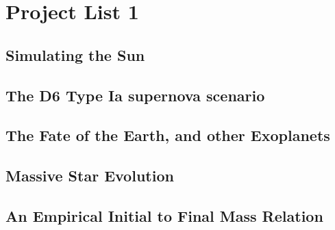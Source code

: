 \documentclass[10pt]{extarticle}
\begin{document}
\section{Project List 1}
\subsection{Simulating the Sun}
\subsection{The D6 Type Ia supernova scenario}
\subsection{The Fate of the Earth, and other Exoplanets}
\subsection{Massive Star Evolution}
\subsection{An Empirical Initial to Final Mass Relation}
\subsection{}
\end{document}
